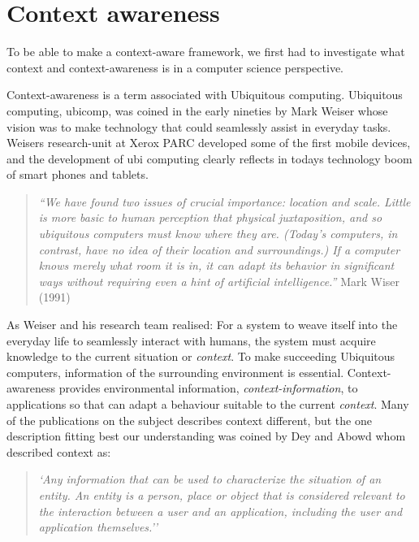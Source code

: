 \documentclass[../report.tex]{subfiles}
\begin{document}
\graphicspath{{img/}{../img/}}
\section{Context awareness}
\label{sec:Context awareness}
To be able to make a context-aware framework, we first had to investigate what context and context-awareness is in a computer science perspective.

Context-awareness is a term associated with Ubiquitous computing. Ubiquitous computing, ubicomp, was coined in the early nineties by Mark Weiser whose vision was to make technology that could seamlessly assist in everyday tasks. Weisers research-unit at Xerox PARC developed some of the first mobile devices, and the development of ubi computing clearly reflects in todays technology boom of smart phones and tablets.

\begin{quote}
\textit{``We have found two issues of crucial importance: location and scale. Little is more basic to human perception that physical juxtaposition, and so ubiquitous computers must know where they are. (Today's computers, in contrast, have no idea of their location and surroundings.) If a computer knows merely what room it is in, it can adapt its behavior in significant ways without requiring even a hint of artificial intelligence.''} Mark Wiser (1991) \cite{Mark Weiser (1991)}
\end{quote} 


As Weiser and his research team realised: For a system to weave itself into the everyday life to seamlessly interact with humans, the system must acquire knowledge to the current situation or \textit{context}. To make succeeding Ubiquitous computers, information of the surrounding environment is essential. Context-awareness provides environmental information, \textit{context-information}, to applications so that can adapt a behaviour suitable to the current \textit{context}. Many of the publications on the subject describes context different, but the one description fitting best our understanding was coined by Dey and Abowd whom described context as:

\begin{quote}
\textit{`Any information that can be used to characterize the situation of an entity. An entity is a person, place or object that is considered relevant to the interaction between a user and an application, including the user and application themselves.''} \cite{Dey and Abowd (2000)}
\end{quote} 
\end{document}
